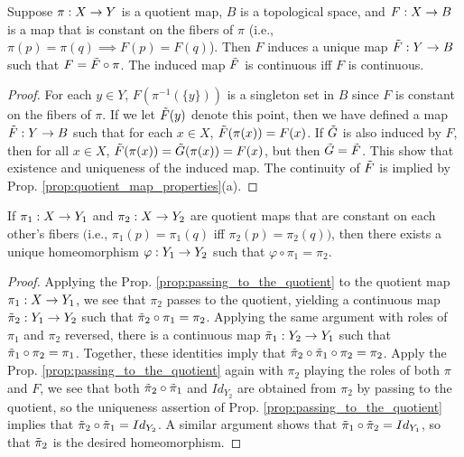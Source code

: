 \documentclass[11pt,a4paper]{article}
\begin{document}
\begin{proposition}\label{prop:passing_to_the_quotient}
Suppose $\pi:X\rightarrow Y$ is a quotient map, $B$ is a topological space, and $F:X\rightarrow B$ is a map that is constant on the fibers of $\pi$ (i.e., $\pi(p) = \pi(q)\implies F(p)=F(q)$). Then $F$ induces a unique map $\Tilde{F}:Y\rightarrow B$ such that $F = \Tilde{F}\circ \pi$. The induced map $\Tilde{F}$ is continuous iff $F$ is continuous.
\end{proposition}

\begin{proof}
For each $y\in Y$, $F(\pi^{-1}(\{y\}))$ is a singleton set in $B$ since $F$ is constant on the fibers of $\pi$. If we let $\Tilde{F}(y)$ denote this point, then we have defined a map $\Tilde{F}:Y\rightarrow B$ such that for each $x\in X$, $\Tilde{F}(\pi(x)) = F(x)$. If $\Tilde{G}$ is also induced by $F$, then for all $x\in X$, $\Tilde{F}(\pi(x)) = \Tilde{G}(\pi(x)) = F(x)$, but then $\Tilde{G} = \Tilde{F}$. This show that existence and uniqueness of the induced map. The continuity of $\Tilde{F}$ is implied by Prop. \ref{prop:quotient_map_properties}(a).
\end{proof}

\begin{proposition}
If $\pi_1:X\rightarrow Y_1$ and $\pi_2:X\rightarrow Y_2$ are quotient maps that are constant on each other's fibers $($i.e., $\pi_1(p) = \pi_1(q)$ iff $\pi_2(p) = \pi_2(q))$, then there exists a unique homeomorphism $\varphi:Y_1\rightarrow Y_2$ such that $\varphi\circ\pi_1 = \pi_2$.
\end{proposition}

\begin{proof}
Applying the Prop. \ref{prop:passing_to_the_quotient} to the quotient map $\pi_1:X\rightarrow Y_1$, we see that $\pi_2$ passes to the quotient, yielding a continuous map $\Tilde{\pi}_2:Y_1\rightarrow Y_2$ such that $\Tilde{\pi}_2\circ \pi_1 = \pi_2$. Applying the same argument with roles of $\pi_1$ and $\pi_2$ reversed, there is a continuous map $\Tilde{\pi}_1:Y_2\rightarrow Y_1$ such that $\Tilde{\pi}_1\circ\pi_2 = \pi_1$. Together, these identities imply that $\Tilde{\pi}_2\circ\Tilde{\pi}_1\circ\pi_2 = \pi_2$. Apply the Prop. \ref{prop:passing_to_the_quotient} again with $\pi_2$ playing the roles of both $\pi$ and $F$, we see that both $\Tilde{\pi}_2\circ\Tilde{\pi}_1$ and $Id_{Y_2}$ are obtained from $\pi_2$ by passing to the quotient, so the uniqueness assertion of Prop. \ref{prop:passing_to_the_quotient} implies that $\Tilde{\pi}_2\circ\Tilde{\pi}_1 = Id_{Y_2}$. A similar argument shows that $\Tilde{\pi}_1\circ\Tilde{\pi}_2 = Id_{Y_1}$, so that $\Tilde{\pi}_2$ is the desired homeomorphism.
\end{proof}
\end{document}
